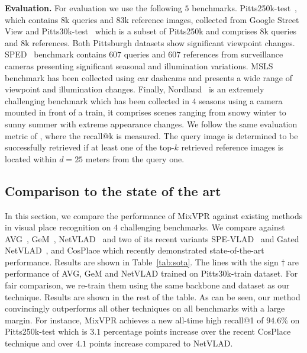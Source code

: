 \documentclass[10pt,twocolumn,letterpaper]{article}
\begin{document}
\noindent\textbf{Evaluation.} For evaluation we use the following $5$ benchmarks. Pitts250k-test~\cite{torii2013visual}, which contains $8$k queries and $83$k reference images, collected from Google Street View and Pitts30k-test~\cite{torii2013visual} which is a subset of Pitts250k and comprises $8$k queries and $8$k references. Both Pittsburgh datasets show significant viewpoint changes. SPED~\cite{zaffar2021vpr} benchmark contains $607$ queries and $607$ references from surveillance cameras presenting significant seasonal and illumination variations. MSLS~\cite{warburg2020mapillary} benchmark has been collected using car dashcams and presents a wide range of viewpoint and illumination changes. Finally, Nordland~\cite{zaffar2021vpr} is an extremely challenging benchmark which has been collected in $4$ seasons using a camera mounted in front of a train, it comprises scenes ranging from snowy winter to sunny summer with extreme appearance changes.
We follow the same evaluation metric of \cite{arandjelovic2016netvlad, kim2017learned, warburg2020mapillary, zaffar2021vpr, wang2022transvpr, berton2022rethinking}, where the recall@k is measured. The query image is determined to be successfully retrieved if at least one of the top-$k$ retrieved reference images is located within $d = 25$ meters from the query one.

\subsection{Comparison to the state of the art}

In this section, we compare the performance of MixVPR against existing methods in visual place recognition on $4$ challenging benchmarks. We compare against AVG~\cite{arandjelovic2016netvlad}, GeM~\cite{radenovic2018fine}, NetVLAD~\cite{arandjelovic2016netvlad} and two of its recent variants SPE-VLAD~\cite{yu2019spatial} and Gated NetVLAD~\cite{zhang2021vector}, and CosPlace which recently demonstrated state-of-the-art performance. 
Results are shown  in Table~\ref{tab:sota}. The lines with the sign $\dagger$ are performance of AVG, GeM and NetVLAD  trained on Pitts30k-train dataset. For fair comparison, we re-train them using the same backbone and dataset as our technique. Results are shown in the rest of the table. As can be seen, our method convincingly outperforms all other techniques on all benchmarks with a large margin. For instance, MixVPR achieves a new all-time high recall@1 of $\mathbf{94.6}$\% on Pitts250k-test which is $3.1$ percentage points increase over the recent CosPlace technique and over $4.1$ points increase compared to NetVLAD.
\end{document}
